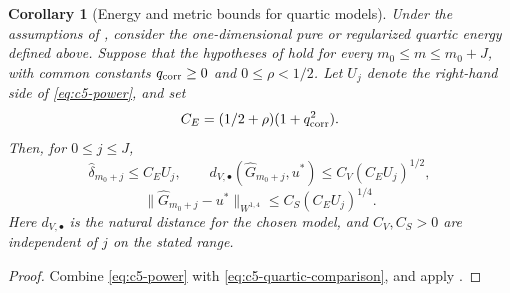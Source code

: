 \documentclass[11pt]{article}
\newtheorem{corollary}[theorem]{Corollary}
\theoremstyle{remark}\newtheorem{remark}[theorem]{Remark}
\begin{document}
\begin{corollary}[Energy and metric bounds for quartic models]
\label{cor:c5-power-metrics}
Under the assumptions of , consider the
one-dimensional pure or regularized quartic energy defined above.
Suppose that the hypotheses of  hold for every
$m_0\le m\le m_0+J$, with common constants
$q_{\rm corr}\ge0$ and $0\le\rho<1/2$.
Let $U_j$ denote the right-hand side of \eqref{eq:c5-power}, and set
\[
  C_E=(1/2+\rho)(1+q_{\rm corr}^2).
\]
Then, for $0\le j\le J$,
\[
  \widehat\delta_{m_0+j}\le C_EU_j,\qquad
  d_{V,\bullet}(\widehat G_{m_0+j},u^*)
    \le C_V(C_EU_j)^{1/2},
\]
\[
  \|\widehat G_{m_0+j}-u^*\|_{W^{1,4}}
    \le C_S(C_EU_j)^{1/4}.
\]
Here $d_{V,\bullet}$ is the natural distance for the chosen model,
and $C_V,C_S>0$ are independent of $j$ on the stated range.
\end{corollary}

\begin{proof}
Combine \eqref{eq:c5-power} with
\eqref{eq:c5-quartic-comparison}, and apply
\CGAEnergyTheoremReference{}.
\end{proof}

\ifdefined\CGAChapterFiveEmbedded
\else
\end{document}
